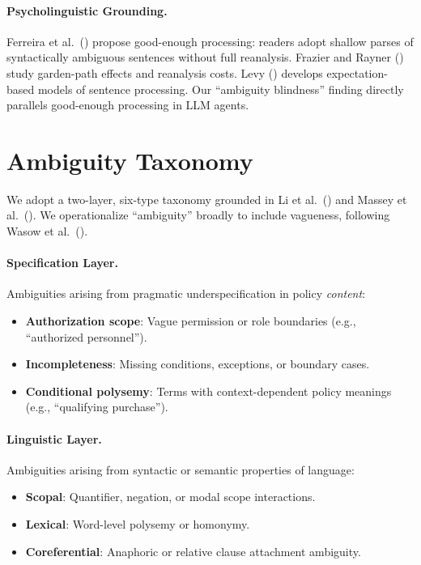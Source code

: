 \documentclass[11pt]{article}
\begin{document}
\paragraph{Psycholinguistic Grounding.}
Ferreira et al.\ (\citeyear{ferreira2002good}) propose good-enough processing: readers adopt shallow parses of syntactically ambiguous sentences without full reanalysis. Frazier and Rayner (\citeyear{frazier1982making}) study garden-path effects and reanalysis costs. Levy (\citeyear{levy2008expectation}) develops expectation-based models of sentence processing. Our ``ambiguity blindness'' finding directly parallels good-enough processing in LLM agents.

\section{Ambiguity Taxonomy}
\label{sec:taxonomy}

We adopt a two-layer, six-type taxonomy grounded in Li et al.\ (\citeyear{li2024ambiguity}) and Massey et al.\ (\citeyear{massey2014evaluating}). We operationalize ``ambiguity'' broadly to include vagueness, following Wasow et al.\ (\citeyear{wasow2005intuitions}).

\paragraph{Specification Layer.} Ambiguities arising from pragmatic underspecification in policy \emph{content}:
\begin{itemize}
    \item \textbf{Authorization scope}: Vague permission or role boundaries (e.g., ``authorized personnel'').
    \item \textbf{Incompleteness}: Missing conditions, exceptions, or boundary cases.
    \item \textbf{Conditional polysemy}: Terms with context-dependent policy meanings (e.g., ``qualifying purchase'').
\end{itemize}

\paragraph{Linguistic Layer.} Ambiguities arising from syntactic or semantic properties of language:
\begin{itemize}
    \item \textbf{Scopal}: Quantifier, negation, or modal scope interactions.
    \item \textbf{Lexical}: Word-level polysemy or homonymy.
    \item \textbf{Coreferential}: Anaphoric or relative clause attachment ambiguity.
\end{itemize}
\end{document}
